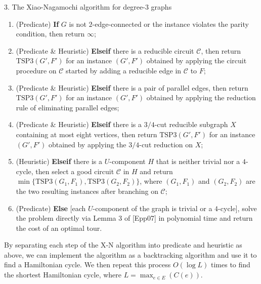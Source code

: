 \documentclass[]{templates/poster}
\begin{document}
\begin{frame}{}
\begin{columns}[t]
  \begin{column}{0.422\linewidth}
  \begin{block}{\Large 3. The Xiao-Nagamochi algorithm for degree-3 graphs}
  \begin{enumerate}
\item (Predicate) {\bf If} $G$ is not $2$-edge-connected or the instance violates the parity condition, then return $\infty$;
\item (Predicate \& Heuristic) {\bf Elseif} there is a reducible circuit $\mathcal{C}$, then return $\text{TSP3}(G', F')$ for an instance $(G',F')$ obtained by applying the circuit procedure on $\mathcal{C}$ started by adding a reducible edge in $\mathcal{C}$ to $F$;
\item (Predicate \& Heuristic) {\bf Elseif} there is a pair of parallel edges, then return $\text{TSP3}(G',F')$ for an instance $(G',F')$ obtained by applying the reduction rule of eliminating parallel edges;
\item (Predicate \& Heuristic) {\bf Elseif} there is a $3/4$-cut reducible subgraph $X$ containing at most eight vertices, then return $\text{TSP3}(G',F')$ for an instance $(G',F')$ obtained by applying the $3/4$-cut reduction on $X$;
\item (Heuristic) {\bf Elseif} there is a $U$-component $H$ that is neither trivial nor a $4$-cycle, then select a good circuit $\mathcal{C}$ in $H$ and return $\min\{\text{TSP3}(G_1,F_1), \text{TSP3}(G_2,F_2)\}$, where $(G_1,F_1)$ and $(G_2,F_2)$ are the
two resulting instances after branching on $\mathcal{C}$;
\item (Predicate) {\bf Else} [each $U$-component of the graph is trivial or a $4$-cycle], solve the problem directly via Lemma 3 of [Epp07] in polynomial time and return the cost of an optimal tour.
\end{enumerate}

  By separating each step of the X-N algorithm into predicate and heuristic as above, we can implement the algorithm as a backtracking algorithm and use it to find a Hamiltonian cycle. We then repeat this process $O(\log L)$ times to find the shortest Hamiltonian cycle, where $L = \max_{e \in E}(C(e))$.
  \end{block}
  \end{column}
\end{columns}
  
  \begin{columns}[t]
  \begin{column}{0.422\linewidth}


\end{column}
\end{columns}
\end{frame}
\end{document}
